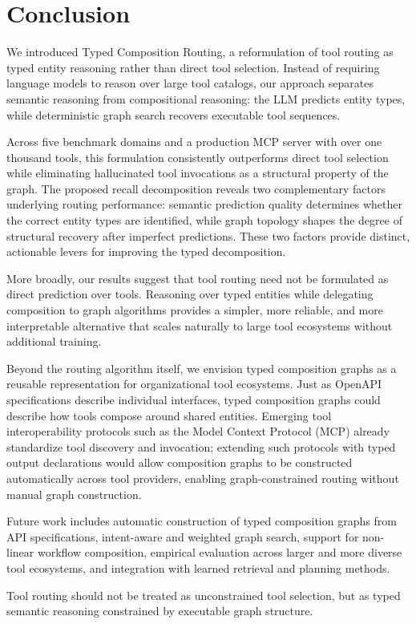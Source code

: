 \section{Conclusion}
\label{sec:conclusion}

We introduced Typed Composition Routing, a reformulation of tool routing as typed entity reasoning rather than direct tool selection.
Instead of requiring language models to reason over large tool catalogs, our approach separates semantic reasoning from compositional reasoning: the LLM predicts entity types, while deterministic graph search recovers executable tool sequences.

Across five benchmark domains and a production MCP server with over one thousand tools, this formulation consistently outperforms direct tool selection while eliminating hallucinated tool invocations as a structural property of the graph.
The proposed recall decomposition reveals two complementary factors underlying routing performance: semantic prediction quality determines whether the correct entity types are identified, while graph topology shapes the degree of structural recovery after imperfect predictions.
These two factors provide distinct, actionable levers for improving the typed decomposition.

More broadly, our results suggest that tool routing need not be formulated as direct prediction over tools.
Reasoning over typed entities while delegating composition to graph algorithms provides a simpler, more reliable, and more interpretable alternative that scales naturally to large tool ecosystems without additional training.

Beyond the routing algorithm itself, we envision typed composition graphs as a reusable representation for organizational tool ecosystems.
Just as OpenAPI specifications describe individual interfaces, typed composition graphs could describe how tools compose around shared entities.
Emerging tool interoperability protocols such as the Model Context Protocol (MCP) already standardize tool discovery and invocation; extending such protocols with typed output declarations would allow composition graphs to be constructed automatically across tool providers, enabling graph-constrained routing without manual graph construction.

Future work includes automatic construction of typed composition graphs from API specifications, intent-aware and weighted graph search, support for non-linear workflow composition, empirical evaluation across larger and more diverse tool ecosystems, and integration with learned retrieval and planning methods.

Tool routing should not be treated as unconstrained tool selection, but as typed semantic reasoning constrained by executable graph structure.